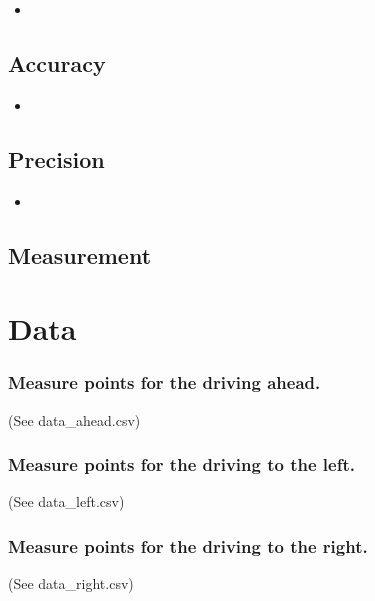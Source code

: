 \documentclass{scrartcl}
\begin{document}
\begin{itemize}
\item
\end{itemize}

\subsection{Accuracy}
\begin{itemize}
\item
\end{itemize}

\subsection{Precision}
\begin{itemize}
\item
\end{itemize}


\subsection{Measurement}


\section{Data}
\subsubsection{Measure points for the driving ahead.}
 (See data\_ahead.csv)\\

\subsubsection{Measure points for the driving to the left.}
 (See data\_left.csv)\\

\subsubsection{Measure points for the driving to the right.}
 (See data\_right.csv)\\
\end{document}
